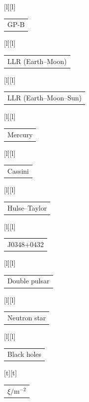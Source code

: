 %    
%
%
\begin{psfrags}%
\psfragscanon%
%
[l][l]{\color[rgb]{0,0,0}\setlength{\tabcolsep}{0pt}\begin{tabular}{l}GP-B\end{tabular}}%
[l][l]{\color[rgb]{0,0,0}\setlength{\tabcolsep}{0pt}\begin{tabular}{l}LLR (Earth--Moon)\end{tabular}}%
[l][l]{\color[rgb]{0,0,0}\setlength{\tabcolsep}{0pt}\begin{tabular}{l}LLR (Earth--Moon--Sun)\end{tabular}}%
[l][l]{\color[rgb]{0,0,0}\setlength{\tabcolsep}{0pt}\begin{tabular}{l}Mercury\end{tabular}}%
[l][l]{\color[rgb]{0,0,0}\setlength{\tabcolsep}{0pt}\begin{tabular}{l}Cassini\end{tabular}}%
[l][l]{\color[rgb]{0,0,0}\setlength{\tabcolsep}{0pt}\begin{tabular}{l}Hulse--Taylor\end{tabular}}%
[l][l]{\color[rgb]{0,0,0}\setlength{\tabcolsep}{0pt}\begin{tabular}{l}J0348+0432\end{tabular}}%
[l][l]{\color[rgb]{0,0,0}\setlength{\tabcolsep}{0pt}\begin{tabular}{l}Double pulsar\end{tabular}}%
[l][l]{\color[rgb]{0,0,0}\setlength{\tabcolsep}{0pt}\begin{tabular}{l}Neutron star\end{tabular}}%
[l][l]{\color[rgb]{0,0,0}\setlength{\tabcolsep}{0pt}\begin{tabular}{l}Black holes\end{tabular}}%
[t][t]{\color[rgb]{0,0,0}\setlength{\tabcolsep}{0pt}\begin{tabular}{c}{\Large{$\xi/\mathrm{m^{-2}}$}}\end{tabular}}%

\end{psfrags}
